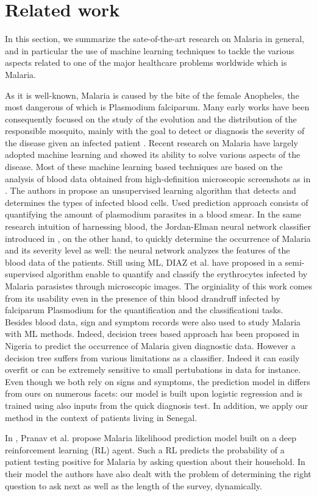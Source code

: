 \section{Related work}\label{related_work}
In this section, we summarize the sate-of-the-art research on Malaria in general, and in particular the
use of machine learning techniques to tackle the various aspects related to one of the 
major healthcare problems worldwide which is Malaria.

As it is well-known, Malaria is caused by the bite of the female Anopheles, the most dangerous of which
is Plasmodium falciparum. Many early works have been consequently focused on the study of the evolution and
the distribution of the responsible mosquito, mainly with the goal to detect or diagnosis the severity of the 
disease given an infected patient \cite{Fe03,Al09}. Recent research on Malaria have largely adopted machine learning
and showed its ability to solve various aspects of the disease. Most of these machine learning based techniques are 
based on the analysis of blood data obtained from high-definition microscopic screenshots as in \cite{Ku18}. The authors
in \cite{Ku18} propose an unsupervised learning algorithm that detects and determines the types of infected blood cells.
Used prediction approach consists of quantifying the amount of plasmodium parasites in a blood smear. In the same research intuition
of harnessing blood, the Jordan-Elman neural network classifier introduced in \cite{Ha15}, on the other hand, to quickly determine the occurrence 
of Malaria and its severity level as well: the neural network analyzes the features of the blood data of the patients.  
Still using ML, DIAZ et al. have proposed in \cite{Dia09} a semi-supervised algorithm enable to quantify and classify the 
erythrocytes infected by Malaria parasistes through microscopic images. The orginiality of this work comes from its usability
even in the presence of thin blood drandruff infected by falciparum Plasmodium for the quantification and the classificationi tasks.
Besides blood data, sign and symptom records were also used to study Malaria with ML methods. Indeed, decision trees based approach
has been proposed in Nigeria \cite{Ug10} to predict the occurrence of Malaria given diagnostic data. However a decision tree suffers 
from various limitations as a classifier. Indeed it can easily overfit or can be extremely sensitive to small pertubations in data for instance.
Even though we both rely on signs and symptoms, the prediction model in \cite{Ug10} differs from ours on numerous facets: our model is built upon
logistic regression and is trained using also inputs from the quick diagnosis test. In addition, we apply our method in the context of patients living in Senegal. 

In \cite{Pr17}, Pranav et al. propose Malaria likelihood prediction model built on a deep reinforcement learning (RL) agent. 
Such a RL predicts the probability of a patient testing positive for Malaria by asking question about their household. In 
their model the authors have also dealt with the problem of determining the right question to ask next as well as the length of the survey, dynamically.
